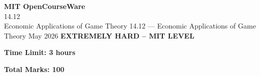 \documentclass[12pt,a4paper]{exam}
\begin{document}
\begin{center}
{\LARGE \textbf{MIT OpenCourseWare}}\\14.12\\Economic Applications of Game Theory
\vspace{0.5cm}
{14.12} --- {Economic Applications of Game Theory}
\vspace{0.3cm}
May 2026
\vspace{0.3cm}
\textbf{EXTREMELY HARD -- MIT LEVEL}
\end{center}

\begin{center}
\textbf{Time Limit: 3 hours}
\end{center}

\begin{center}
\textbf{Total Marks: 100}
\end{center}

\vspace{0.5cm}
\end{document}
